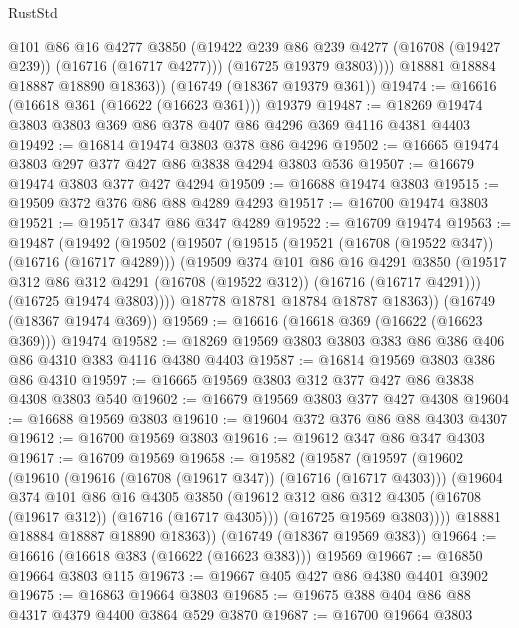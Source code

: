 \begin{lexlean}{RustStd}
\begin{coremodule}
              @101
              @86
              @16
              @4277
              @3850
              (@19422 @239 @86 @239 @4277 (@16708 (@19427 @239)) (@16716 (@16717 @4277)))
              (@16725 @19379 @3803))))
        @18881
        @18884
        @18887
        @18890
        @18363))
    (@16749 (@18367 @19379 @361))
@19474 := @16616 (@16618 @361 (@16622 (@16623 @361))) @19379
@19487 := @18269 @19474 @3803 @3803 @369 @86 @378 @407 @86 @4296 @369 @4116 @4381 @4403
@19492 := @16814 @19474 @3803 @378 @86 @4296
@19502 := @16665 @19474 @3803 @297 @377 @427 @86 @3838 @4294 @3803 @536
@19507 := @16679 @19474 @3803 @377 @427 @4294
@19509 := @16688 @19474 @3803
@19515 := @19509 @372 @376 @86 @88 @4289 @4293
@19517 := @16700 @19474 @3803
@19521 := @19517 @347 @86 @347 @4289
@19522 := @16709 @19474
@19563 := @19487
    (@19492
      (@19502
        (@19507
          (@19515
            (@19521 (@16708 (@19522 @347)) (@16716 (@16717 @4289)))
            (@19509
              @374
              @101
              @86
              @16
              @4291
              @3850
              (@19517 @312 @86 @312 @4291 (@16708 (@19522 @312)) (@16716 (@16717 @4291)))
              (@16725 @19474 @3803))))
        @18778
        @18781
        @18784
        @18787
        @18363))
    (@16749 (@18367 @19474 @369))
@19569 := @16616 (@16618 @369 (@16622 (@16623 @369))) @19474
@19582 := @18269 @19569 @3803 @3803 @383 @86 @386 @406 @86 @4310 @383 @4116 @4380 @4403
@19587 := @16814 @19569 @3803 @386 @86 @4310
@19597 := @16665 @19569 @3803 @312 @377 @427 @86 @3838 @4308 @3803 @540
@19602 := @16679 @19569 @3803 @377 @427 @4308
@19604 := @16688 @19569 @3803
@19610 := @19604 @372 @376 @86 @88 @4303 @4307
@19612 := @16700 @19569 @3803
@19616 := @19612 @347 @86 @347 @4303
@19617 := @16709 @19569
@19658 := @19582
    (@19587
      (@19597
        (@19602
          (@19610
            (@19616 (@16708 (@19617 @347)) (@16716 (@16717 @4303)))
            (@19604
              @374
              @101
              @86
              @16
              @4305
              @3850
              (@19612 @312 @86 @312 @4305 (@16708 (@19617 @312)) (@16716 (@16717 @4305)))
              (@16725 @19569 @3803))))
        @18881
        @18884
        @18887
        @18890
        @18363))
    (@16749 (@18367 @19569 @383))
@19664 := @16616 (@16618 @383 (@16622 (@16623 @383))) @19569
@19667 := @16850 @19664 @3803 @115
@19673 := @19667 @405 @427 @86 @4380 @4401 @3902
@19675 := @16863 @19664 @3803
@19685 := @19675 @388 @404 @86 @88 @4317 @4379 @4400 @3864 @529 @3870
@19687 := @16700 @19664 @3803

\end{coremodule}
\end{lexlean}
